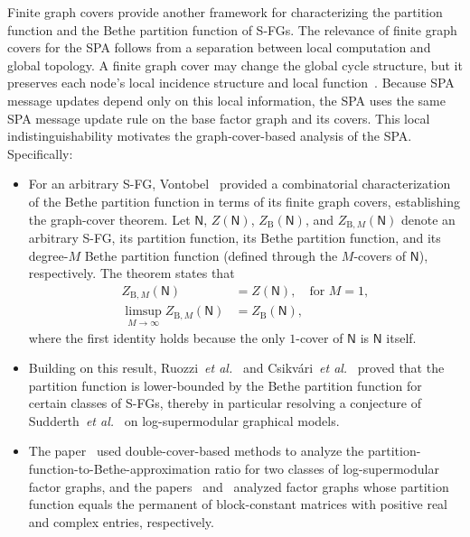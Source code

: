 \documentclass[journal]{IEEEtran}
\newcommand{\add}[1]{{\color{black}#1}}
\newcommand{\sfN}{ \mathsf{N} }
\newcommand{\ZB}{Z_{ \mathrm{B} }}
\newcommand{\ZBM}{ Z_{\mathrm{B},M} }
\newcommand*{\etal}{\textit{et al.}}
\begin{document}
\add{Finite graph covers provide another framework for characterizing the
  partition function and the Bethe partition function of S-FGs. The relevance
  of finite graph covers for the SPA follows from a separation between local
  computation and global topology. A finite graph cover may change the global
  cycle structure, but it preserves each node's local incidence structure and
  local function~\cite{Koetter2003}. Because SPA message updates depend only
  on this local information, the SPA uses the same SPA message update rule on
  the base factor graph and its covers. This local indistinguishability
  motivates the graph-cover-based analysis of the SPA. Specifically:}
\begin{itemize}

  \item For an arbitrary S-FG, Vontobel~\cite{Vontobel2013} provided a
        combinatorial characterization of the Bethe partition function in terms of
        its finite graph covers, establishing the graph-cover theorem. \add{Let
          $\sfN$, $Z(\sfN)$, $\ZB(\sfN)$, and $\ZBM(\sfN)$ denote an arbitrary S-FG,
          its partition function, its Bethe partition function, and its degree-$M$
          Bethe partition function (defined through the $M$-covers of $\sfN$),
          respectively}. \add{The theorem states that}
        \begin{align*}
          \ZBM(\sfN)                         & = Z(\sfN), \quad \text{for } M = 1, \nonumber \\
          \limsup_{ M \to \infty} \ZBM(\sfN) & = \ZB(\sfN),
        \end{align*}
        where the first identity holds because the only $1$-cover of $\sfN$ is $\sfN$ itself.

  \item \add{Building on this result}, \add{Ruozzi~\etal~\cite{Ruozzi2012} and
          Csikv\'{a}ri~\etal~\cite{Csikvari2022}} proved that the \add{partition
          function is lower-bounded by the Bethe partition function} for certain
        classes of S-FGs, \add{thereby in particular resolving a conjecture of
          Sudderth~\etal~\cite{E.B.Sudderth2007} on} log-supermodular graphical
        models.

  \item \add{The paper~\cite{Vontobel2025} used double-cover-based methods to
          analyze the partition-function-to-Bethe-approximation ratio for two
          classes of log-supermodular factor graphs, and the papers~\cite{Wu2026}
          and~\cite{Zhou2026} analyzed factor graphs whose partition function equals
          the permanent of block-constant matrices with positive real and complex
          entries, respectively.}


\end{itemize}
\end{document}
